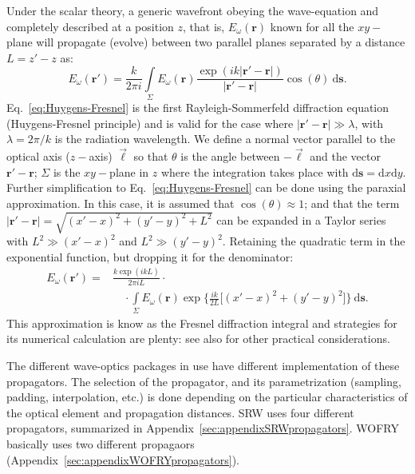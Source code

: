 \documentclass{iucr}              %
\begin{document}
Under the scalar theory, a generic wavefront obeying the wave-equation and completely described at a position $z$, that is, $E_\omega(\textbf{r})$ known for all the $xy-$plane will propagate (evolve) between two parallel planes separated by a distance $L=z'-z$ as: 
\begin{equation}\label{eq:Huygens-Fresnel}
    E_\omega(\textbf{r}') = \frac{k}{2\pi i}\int\limits_{\Sigma}{E_\omega(\textbf{r})\frac{\exp{(ik\vert\textbf{r}' - \textbf{r}\vert)}}{\vert\textbf{r}' - \textbf{r}\vert}\cos{(\theta)}~\mathrm{d}\textbf{s}}.
\end{equation}
Eq.~\ref{eq:Huygens-Fresnel} is the first Rayleigh-Sommerfeld diffraction equation (Huygens-Fresnel principle) and is valid for the case where $\vert\textbf{r}' - \textbf{r}\vert\gg\lambda$, with $\lambda=2\pi \big/ k$ is the radiation wavelength. We define a normal vector parallel to the optical axis ($z-$axis) $\vec{\ell}$ so that $\theta$ is the angle between $-\vec{\ell}$ and the vector $\textbf{r}'-\textbf{r}$; $\Sigma$ is the $xy-$plane in $z$ where the integration takes place with $\mathrm{d}\textbf{s}=\mathrm{d}x\mathrm{d}y$. Further simplification to Eq.~\ref{eq:Huygens-Fresnel} can be done using the paraxial approximation. In this case, it is assumed that $\cos{(\theta)}\approx1$; and that the term $\vert\textbf{r}' - \textbf{r}\vert=\sqrt{(x'-x)^2 + (y'-y)^2 + L^2}$ can be expanded in a Taylor series with $L^2\gg(x'-x)^2$ and $L^2\gg(y'-y)^2$. Retaining the quadratic term in the exponential function, but dropping it for the denominator:
\begin{equation}\label{eq:Fresnel}
\begin{split}
    E_\omega(\textbf{r}') = &\frac{k\exp{(ikL)}}{2\pi i L}\cdot \\
    &\quad\cdot\int\limits_{\Sigma}{E_\omega(\textbf{r})\exp{\bigg\{ \frac{ik}{2L}\big[ (x'-x)^2 + (y'-y)^2 \big]\bigg\}}~\mathrm{d}\textbf{s}}.
\end{split}
\end{equation}
This approximation is know as the Fresnel diffraction integral and strategies for its numerical calculation are plenty: \cite{Kelly2014,Goodman2017} see also \cite{Rees87, Stern2004, Zhang2020} for other practical considerations.

The different wave-optics packages in use have different implementation of these propagators. The selection of the propagator, and its parametrization (sampling, padding, interpolation, etc.) is done depending on the particular characteristics of the optical element and propagation distances. SRW uses four different propagators, summarized in Appendix~\ref{sec:appendixSRWpropagators}. WOFRY basically uses two different propagaors (Appendix~\ref{sec:appendixWOFRYpropagators}).   
\end{document}
